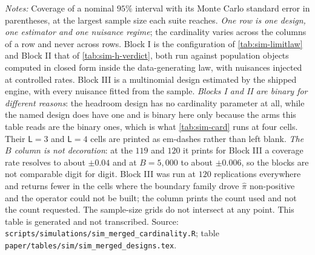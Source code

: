 \documentclass[
  12pt]{article}
\newcommand{\1}[1]{\mathds{1}\left[#1\right]}
\theoremstyle{plain}
\theoremstyle{definition}
\theoremstyle{definition}
\theoremstyle{remark}
\begin{document}
\begin{table}[!htbp]
\centering
\begin{threeparttable}
\caption{The three simulation suites at the cardinality all three share}
\label{tab:sim-merged-designs}
\footnotesize

\begin{tablenotes}\footnotesize
\item \textit{Notes:} Coverage of a nominal $95\%$ interval with its Monte Carlo
standard error in parentheses, at the largest sample size each suite reaches.
\emph{One row is one design, one estimator and one nuisance regime}; the
cardinality varies across the columns of a row and never across rows. Block I is
the configuration of \cref{tab:sim-limitlaw} and Block II that of
\cref{tab:sim-h-verdict}, both run against population objects computed in closed
form inside the data-generating law, with nuisances injected at controlled rates.
Block III is a multinomial design estimated by the shipped engine, with every
nuisance fitted from the sample. \emph{Blocks I and II are binary for different
reasons}: the headroom design has no cardinality parameter at all, while the
named design does have one and is binary here only because the arms this table
reads are the binary ones, which is what \cref{tab:sim-card} runs at four cells.
Their $\mathsf L=3$ and $\mathsf L=4$ cells are printed as em-dashes rather than
left blank. \emph{The $B$ column is not decoration}: at the $119$ and $120$ it
prints for Block III a coverage rate resolves to about $\pm0.04$ and at
$B=5{,}000$ to about $\pm0.006$, so the blocks are not comparable digit for
digit. Block III was run at $120$ replications everywhere and returns fewer in
the cells where the boundary family drove $\hat\pi$ non-positive and the operator
could not be built; the column prints the count used and not the count
requested. The sample-size grids do not intersect
at any point. This table is generated and not transcribed. Source:
\texttt{scripts/simulations/sim\_merged\_cardinality.R}; table
\texttt{paper/tables/sim/sim\_merged\_designs.tex}.
\end{tablenotes}
\end{threeparttable}
\end{table}
\end{document}
